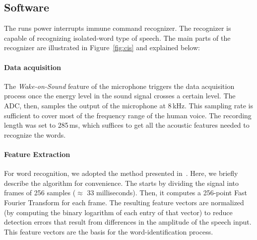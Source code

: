\subsection{Software}
\label{sec:software}
The \cim runs power interrupts immune command recognizer. The recognizer is capable of recognizing isolated-word type of speech. 
The main parts of the recognizer are illustrated in Figure~\ref{fig:cis} and explained below:

\paragraph{Data acquisition}
The \textit{Wake-on-Sound} feature of the microphone triggers the data acquisition process once the energy level in the sound signal crosses a certain level. The ADC, then, samples the output of the microphone at 8\,kHz. This sampling rate is sufficient to cover most of the frequency range of the human voice. The recording length was set to 285\,ms, which suffices to get all the acoustic features needed to recognize the words.


\paragraph{Feature Extraction}
For word recognition, we adopted the method presented in~\cite{hopper1992fft}. Here, we briefly describe the algorithm for convenience. The \cim starts by dividing the signal into frames of 256 samples ($\approx$ 33 milliseconds). 
Then, it computes a 256-point Fast Fourier Transform for each frame. The resulting feature vectors are normalized (by computing the binary logarithm of each entry of that vector) to reduce detection errors that result from differences in the amplitude of the speech input. This feature vectors are the basis for the word-identification process. 

